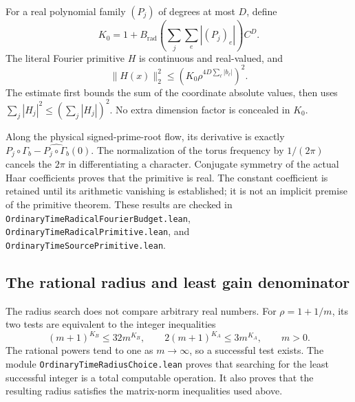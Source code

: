\documentclass[11pt]{article}
\newcommand{\code}[1]{{\small\nolinkurl{#1}}}
\begin{document}
For a real polynomial family $(P_j)$ of degrees at most $D$, define
\[
 K_0=1+B_{\mathrm{rad}}\left(\sum_j\sum_e |(P_j)_e|\right)C^D.
\]
The literal Fourier primitive $H$ is continuous and real-valued, and
\[
 \|H(x)\|_2^2\le
 \left(K_0\rho^{4D\sum_\ell|b_\ell|}\right)^2.
\]
The estimate first bounds the sum of the coordinate absolute values,
then uses $\sum_j |H_j|^2\le(\sum_j|H_j|)^2$. No extra dimension factor
is concealed in $K_0$.

Along the physical signed-prime-root flow, its derivative is exactly
$P_j\circ\Gamma_b-\widehat{P_j\circ\Gamma_b}(0)$. The normalization of
the torus frequency by $1/(2\pi)$ cancels the $2\pi$ in differentiating a
character. Conjugate symmetry of the actual Haar coefficients proves
that the primitive is real. The constant coefficient is retained until
its arithmetic vanishing is established; it is not an implicit premise
of the primitive theorem. These results are checked in
\code{OrdinaryTimeRadicalFourierBudget.lean},
\code{OrdinaryTimeRadicalPrimitive.lean}, and
\code{OrdinaryTimeSourcePrimitive.lean}.

\subsection{The rational radius and least gain denominator}

The radius search does not compare arbitrary real numbers. For
$\rho=1+1/m$, its two tests are equivalent to the integer inequalities
\[
 (m+1)^{K_B}\le32m^{K_B},\qquad
 2(m+1)^{K_A}\le3m^{K_A},\qquad m>0.
\]
The rational powers tend to one as $m\to\infty$, so a successful test
exists. The module \code{OrdinaryTimeRadiusChoice.lean} proves that
searching for the least successful integer is a total computable
operation. It also proves that the resulting radius satisfies the
matrix-norm inequalities used above.
\end{document}
